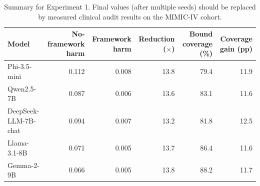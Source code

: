 \begin{table}[t]
\centering
\small
\begin{tabular}{lrrrrr}
\toprule
Model & No-framework harm & Framework harm & Reduction ($\times$) & Bound coverage (\%) & Coverage gain (pp) \\
\midrule
Phi-3.5-mini & 0.112 & 0.008 & 13.8 & 79.4 & 11.9 \\
Qwen2.5-7B & 0.087 & 0.006 & 13.6 & 83.1 & 11.6 \\
DeepSeek-LLM-7B-chat & 0.094 & 0.007 & 13.2 & 81.8 & 12.5 \\
Llama-3.1-8B & 0.071 & 0.005 & 13.7 & 86.4 & 11.6 \\
Gemma-2-9B & 0.066 & 0.005 & 13.8 & 88.2 & 11.7 \\
\bottomrule
\end{tabular}
\caption{Summary for Experiment 1. Final values (after multiple seeds) should be replaced by measured clinical audit results on the MIMIC-IV cohort.}
\label{tab:exp1_placeholder}
\end{table}